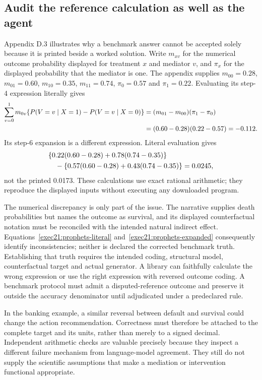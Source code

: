 \subsection{Audit the reference calculation as well as the agent}
\label{exec21:prophets-arithmetic}
Appendix D.3 illustrates why a benchmark answer cannot be accepted solely because
it is printed beside a worked solution. Write $m_{xv}$ for the numerical outcome
probability displayed for treatment $x$ and mediator $v$, and $\pi_x$ for the
displayed probability that the mediator is one. The appendix supplies
$m_{00}=0.28$, $m_{01}=0.60$, $m_{10}=0.35$, $m_{11}=0.74$,
$\pi_0=0.57$ and $\pi_1=0.22$. Evaluating its step-4 expression literally gives
\begin{align}
 \sum_{v=0}^1 m_{0v}
 \{P(V=v\mid X=1)-P(V=v\mid X=0)\}
 &=(m_{01}-m_{00})(\pi_1-\pi_0)\notag\\
 &=(0.60-0.28)(0.22-0.57)=-0.112.
 \label{exec21:prophets-literal}
\end{align}
Its step-6 expansion is a different expression. Literal evaluation gives
\begin{align}
 &\{0.22(0.60-0.28)+0.78(0.74-0.35)\}\notag\\
 &\quad-\{0.57(0.60-0.28)+0.43(0.74-0.35)\}
 =0.0245,
 \label{exec21:prophets-expanded}
\end{align}
not the printed 0.0173. These calculations use exact rational arithmetic;
they reproduce the displayed inputs without executing any downloaded program.
\citep{exec21_prophets,exec21_prophets_reference}

The numerical discrepancy is only part of the issue. The narrative supplies
death probabilities but names the outcome as survival, and its displayed
counterfactual notation must be reconciled with the intended natural indirect
effect. Equations~\eqref{exec21:prophets-literal}
and~\eqref{exec21:prophets-expanded} consequently identify inconsistencies;
neither is declared the corrected benchmark truth. Establishing that truth
requires the intended coding, structural model, counterfactual target and
actual generator. A library can faithfully calculate the wrong expression or
use the right expression with reversed outcome coding. A benchmark protocol
must admit a disputed-reference outcome and preserve it outside the accuracy
denominator until adjudicated under a predeclared rule.

In the banking example, a similar reversal between default and survival could
change the action recommendation. Correctness must therefore be attached to
the complete target and its units, rather than merely to a signed decimal.
Independent arithmetic checks are valuable precisely because they inspect a
different failure mechanism from language-model agreement. They still do not
supply the scientific assumptions that make a mediation or intervention
functional appropriate.


